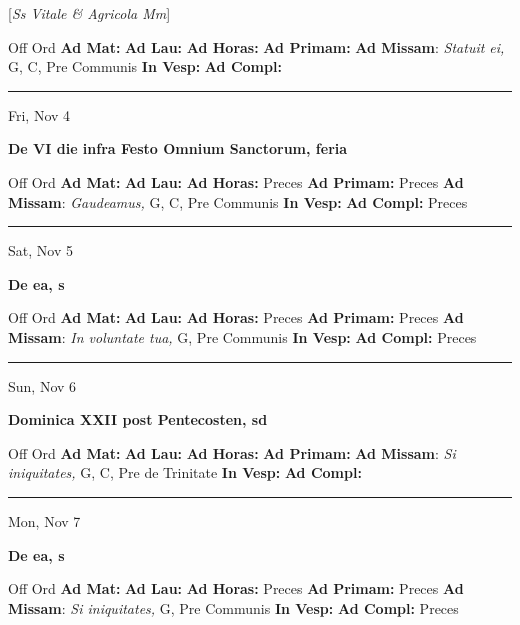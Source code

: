 \documentclass[letterpaper, 10pt]{article}
\begin{document}
[\textit{Ss Vitale \& Agricola Mm}]
\begin{justify}
Off Ord
\textbf{Ad Mat: }
\textbf{Ad Lau: }
\textbf{Ad Horas: }
\textbf{Ad Primam: }
\textbf{Ad Missam}: \textit{Statuit ei,} G, C, Pre Communis
\textbf{In Vesp: }
\textbf{Ad Compl: }\end{justify}



\hrule
\begin{center}
Fri, Nov 4
\end{center}\textbf{ \large De VI die infra Festo Omnium Sanctorum, \textnormal{\normalsize feria}}
\begin{justify}
Off Ord
\textbf{Ad Mat: }
\textbf{Ad Lau: }
\textbf{Ad Horas: }Preces
\textbf{Ad Primam: }Preces
\textbf{Ad Missam}: \textit{Gaudeamus,} G, C, Pre Communis
\textbf{In Vesp: }
\textbf{Ad Compl: }Preces\end{justify}



\hrule
\begin{center}
Sat, Nov 5
\end{center}\textbf{ \large De ea, \textnormal{\normalsize s}}
\begin{justify}
Off Ord
\textbf{Ad Mat: }
\textbf{Ad Lau: }
\textbf{Ad Horas: }Preces
\textbf{Ad Primam: }Preces
\textbf{Ad Missam}: \textit{In voluntate tua,} G, Pre Communis
\textbf{In Vesp: }
\textbf{Ad Compl: }Preces\end{justify}



\hrule
\begin{center}
Sun, Nov 6
\end{center}\textbf{ \large Dominica XXII post Pentecosten, \textnormal{\normalsize sd}}
\begin{justify}
Off Ord
\textbf{Ad Mat: }
\textbf{Ad Lau: }
\textbf{Ad Horas: }
\textbf{Ad Primam: }
\textbf{Ad Missam}: \textit{Si iniquitates,} G, C, Pre de Trinitate
\textbf{In Vesp: }
\textbf{Ad Compl: }\end{justify}



\hrule
\begin{center}
Mon, Nov 7
\end{center}\textbf{ \large De ea, \textnormal{\normalsize s}}
\begin{justify}
Off Ord
\textbf{Ad Mat: }
\textbf{Ad Lau: }
\textbf{Ad Horas: }Preces
\textbf{Ad Primam: }Preces
\textbf{Ad Missam}: \textit{Si iniquitates,} G, Pre Communis
\textbf{In Vesp: }
\textbf{Ad Compl: }Preces\end{justify}
\end{document}
